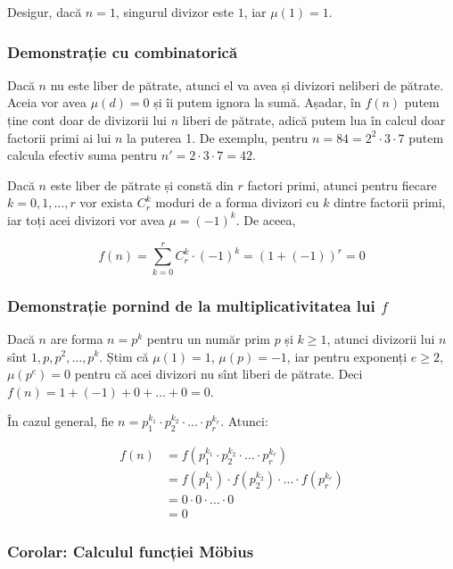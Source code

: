\documentclass[../main.tex]{subfiles}
\begin{document}
Desigur, dacă $n = 1$, singurul divizor este $1$, iar $\mu(1) = 1$.

\subsubsection*{Demonstrație cu combinatorică}

Dacă $n$ nu este liber de pătrate, atunci el va avea și divizori neliberi de pătrate. Aceia vor avea $\mu(d) = 0$ și îi putem ignora la sumă. Așadar, în $f(n)$ putem ține cont doar de divizorii lui $n$ liberi de pătrate, adică putem lua în calcul doar factorii primi ai lui $n$ la puterea 1. De exemplu, pentru $n = 84 = 2^2 \cdot 3 \cdot 7$ putem calcula efectiv suma pentru $n' = 2 \cdot 3 \cdot 7 = 42$.

Dacă $n$ este liber de pătrate și constă din $r$ factori primi, atunci pentru fiecare $k = 0, 1, \dots, r$ vor exista $C_r^k$ moduri de a forma divizori cu $k$ dintre factorii primi, iar toți acei divizori vor avea $\mu = (-1)^k$. De aceea,

$$f(n) = \sum_{k=0}^{r} C_r^k \cdot (-1)^k = (1 + (-1))^r = 0$$

\subsubsection*{Demonstrație pornind de la multiplicativitatea lui \texorpdfstring{$f$}{f}}

Dacă $n$ are forma $n = p^k$ pentru un număr prim $p$ și $k \geq 1$, atunci divizorii lui $n$ sînt $1, p, p^2, \dots, p^k$. Știm că $\mu(1) = 1$, $\mu(p) = -1$, iar pentru exponenți $e \geq 2$, $\mu(p^e) = 0$ pentru că acei divizori nu sînt liberi de pătrate. Deci $f(n) = 1 + (-1) + 0 + \dots + 0 = 0$.

În cazul general, fie $n = p_1^{k_1} \cdot p_2^{k_2} \cdot\dots \cdot p_r^{k_r}$. Atunci:

\begin{align*}
f(n) &= f(p_1^{k_1} \cdot p_2^{k_2} \cdot \dots \cdot p_r^{k_r}) \\
&= f(p_1^{k_1}) \cdot f(p_2^{k_2}) \cdot \dots \cdot f(p_r^{k_r}) \\
&= 0 \cdot 0 \cdot \dots \cdot 0 \\
&= 0
\end{align*}

\subsubsection*{Corolar: Calculul funcției Möbius}
\end{document}
